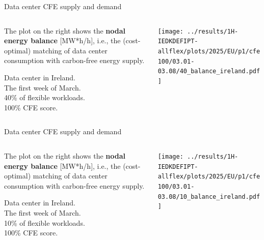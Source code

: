 \begin{frame}{Data center CFE supply and demand}
  \label{nb1-40}

  {\footnotesize
  
  \begin{columns}[T]
    \begin{column}{3.5cm}
      \vspace{0.3cm}
      The plot on the right shows the {\bf nodal energy balance} [MW*h/h], i.e., the (cost-optimal) matching of data center consumption with carbon-free energy supply.

      \vspace{0.2cm}
      Data center in Ireland. \\
      The first week of March. \\
      40\% of flexible workloads.\\
      100\% CFE score.\\
    \end{column}
  
    \begin{column}{11cm}
      \texttt{[image: ../results/1H-IEDKDEFIPT-allflex/plots/2025/EU/p1/cfe100/03.01-03.08/40\_balance\_ireland.pdf]}
    \end{column}
    \end{columns}
    } 

\end{frame}



\begin{frame}{Data center CFE supply and demand}
  \label{nb1-10}

  {\footnotesize
  
  \begin{columns}[T]
    \begin{column}{3.5cm}
      \vspace{0.3cm}
      The plot on the right shows the {\bf nodal energy balance} [MW*h/h], i.e., the (cost-optimal) matching of data center consumption with carbon-free energy supply.

      \vspace{0.2cm}
      Data center in Ireland. \\
      The first week of March. \\
      10\% of flexible workloads.\\
      100\% CFE score.\\
    \end{column}
  
    \begin{column}{11cm}
      \texttt{[image: ../results/1H-IEDKDEFIPT-allflex/plots/2025/EU/p1/cfe100/03.01-03.08/10\_balance\_ireland.pdf]}
    \end{column}
    \end{columns}
    } 

\end{frame}


